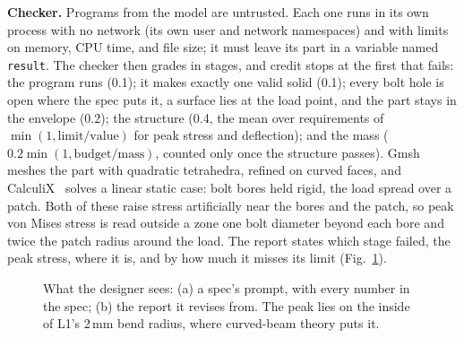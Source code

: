 \documentclass[conference]{IEEEtran}
\begin{document}
\textbf{Checker.} Programs from the model are untrusted. Each one runs in its own process with no
network (its own user and network namespaces) and with limits on memory, CPU time, and file size; it
must leave its part in a variable named \texttt{result}. The checker then grades in stages, and credit
stops at the first that fails: the program runs (0.1); it makes exactly one valid solid (0.1); every
bolt hole is open where the spec puts it, a surface lies at the load point, and the part stays in the
envelope (0.2); the structure (0.4, the mean over requirements of $\min(1,\text{limit}/\text{value})$
for peak stress and deflection); and the mass ($0.2\min(1,\text{budget}/\text{mass})$, counted only once
the structure passes). Gmsh~\cite{geuzaine2009gmsh} meshes the part with quadratic tetrahedra, refined
on curved faces, and CalculiX~\cite{dhondt2004fem} solves a linear static case: bolt bores held rigid,
the load spread over a patch. Both of these raise stress artificially near the bores and the patch, so
peak von Mises stress is read outside a zone one bolt diameter beyond each bore and twice the patch
radius around the load. The report states which stage failed, the peak stress, where it is, and by how
much it misses its limit (Fig.~\ref{fig:example}).

\begin{figure}[t]
\centering\scriptsize
{}
\caption{What the designer sees: (a) a spec's prompt, with every number in the spec; (b) the report it
revises from. The peak lies on the inside of L1's 2\,mm bend radius, where curved-beam theory puts it.}
\label{fig:example}
\end{figure}
\end{document}
